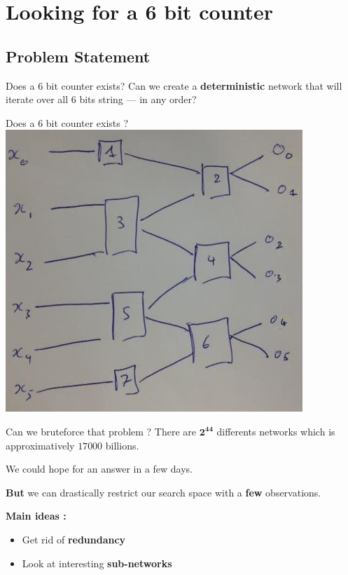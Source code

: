 \documentclass{beamer}
\begin{document}
\section{Looking for a 6 bit counter}


\subsection{Problem Statement}

\begin{frame}{Does a 6 bit counter exists?} 
	Can we create a \textbf{deterministic} network that will iterate over all 6 bits string --- in any order?
\end{frame}

\begin{frame}{Does a 6 bit counter exists ?} 
	\centering\includegraphics[scale=0.55]{netk.png}
\end{frame}


\begin{frame}{Can we bruteforce that problem ?}
	There are $\boldsymbol{2^{44}}$ differents networks which is approximatively $17 000$ billions.
	
	We could hope for an answer in a few days.
	
	\textbf{But} we can drastically restrict our search space with a \textbf{few} observations.
	\bigskip\pause
	
	\textbf{Main ideas :} 
	\begin{itemize}
	\item Get rid of \textbf{redundancy}
	\item Look at interesting \textbf{sub-networks}
	\end{itemize}
\end{frame} 
\end{document}

